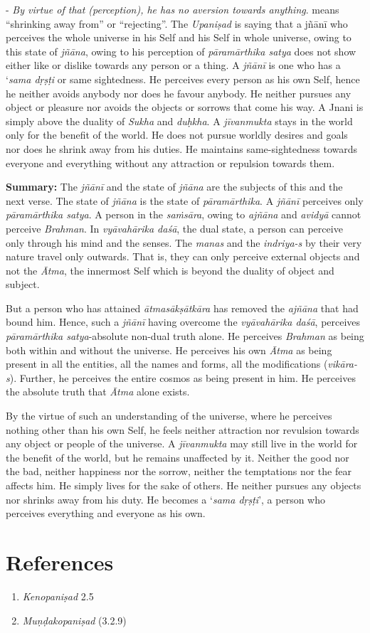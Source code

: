 - \emph{By virtue of that (perception), he has no aversion towards anything}.  means ``shrinking away from'' or ``rejecting''. The \emph{Upaniṣad} is saying that a jñānī who perceives the whole universe in his Self and his Self in whole universe, owing to this state of \emph{jñāna}, owing to his perception of \emph{pāramārthika satya} does not show either like or dislike towards any person or a thing. A \emph{jñānī} is one who has a `\emph{sama dṛṣṭi} or same sightedness. He perceives every person as his own Self, hence he neither avoids anybody nor does he favour anybody. He neither pursues any object or pleasure nor avoids the objects or sorrows that come his way. A Jnani is simply above the duality of \emph{Sukha} and \emph{duḥkha}. A \emph{jīvanmukta} stays in the world only for the benefit of the world. He does not pursue worldly desires and goals nor does he shrink away from his duties. He maintains same-sightedness towards everyone and everything without any attraction or repulsion towards them.

\textbf{Summary:} The \emph{jñānī} and the state of \emph{jñāna} are the subjects of this and the next verse. The state of \emph{jñāna} is the state of \emph{pāramārthika}. A \emph{jñānī} perceives only \emph{pāramārthika satya}. A person in the \emph{saṁsāra}, owing to \emph{ajñāna} and \emph{avidyā} cannot perceive \emph{Brahman}. In \emph{vyāvahārika daśā}, the dual state, a person can perceive only through his mind and the senses. The \emph{manas} and the \emph{indriya-s} by their very nature travel only outwards. That is, they can only perceive external objects and not the \emph{Ātma}, the innermost Self which is beyond the duality of object and subject.

But a person who has attained \emph{ātmasākṣātkāra} has removed the \emph{ajñāna} that had bound him. Hence, such a \emph{jñānī} having overcome the \emph{vyāvahārika daśā}, perceives \emph{pāramārthika satya}-absolute non-dual truth alone. He perceives \emph{Brahman} as being both within and without the universe. He perceives his own \emph{Ātma} as being present in all the entities, all the names and forms, all the modifications (\emph{vikāra-s}). Further, he perceives the entire cosmos as being present in him. He perceives the absolute truth that \emph{Ātma} alone exists.

By the virtue of such an understanding of the universe, where he perceives nothing other than his own Self, he feels neither attraction nor revulsion towards any object or people of the universe. A \emph{jīvanmukta} may still live in the world for the benefit of the world, but he remains unaffected by it. Neither the good nor the bad, neither happiness nor the sorrow, neither the temptations nor the fear affects him. He simply lives for the sake of others. He neither pursues any objects nor shrinks away from his duty. He becomes a `\emph{sama dṛṣṭi}', a person who perceives everything and everyone as his own.

\section*{References}

\begin{enumerate}
\item
  \emph{Kenopaniṣad} 2.5
\item
  \emph{Muṇḍakopaniṣad} (3.2.9)
\end{enumerate}

